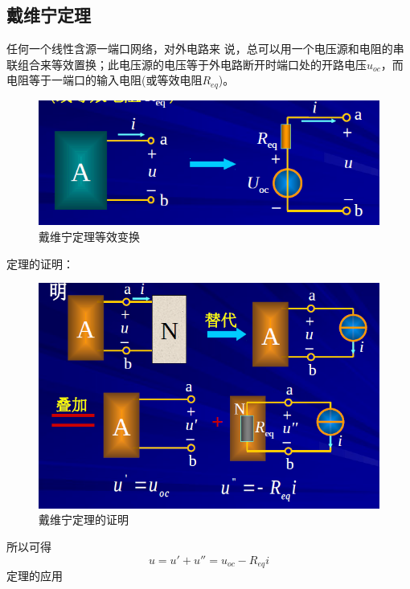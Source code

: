 \documentclass[11pt,a4paper,oneside]{book}
\begin{document}
\subsection{戴维宁定理}
任何一个线性含源一端口网络，对外电路来
说，总可以用一个电压源和电阻的串联组合来等效置换；此电压源的电压等于外电路断开时端口处的开路电压$u_{oc}$，而电阻等于一端口的输入电阻(或等效电阻$R_{eq}$)。
\begin{figure}[H]
	\centering
	\includegraphics[width=0.5\linewidth]{screenshot064}
	\caption{戴维宁定理等效变换}
	\label{fig:screenshot064}
\end{figure}
定理的证明：
\begin{figure}[H]
	\centering
	\includegraphics[width=0.5\linewidth]{screenshot066}
	\caption{戴维宁定理的证明}
	\label{fig:screenshot066}
\end{figure}
所以可得
\begin{equation}
	u=u'+u''=u_{oc}-R_{eq}i
\end{equation}
定理的应用
\end{document}
